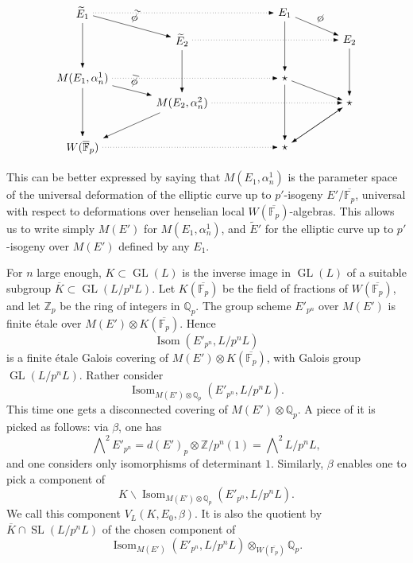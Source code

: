 \documentclass[11pt]{article}
\newcommand{\Z}{\mathbb{Z}}
\newcommand{\Fp}{\mathbb{F}_{p}}
\newcommand{\Qp}{\mathbb{Q}_{p}}
\newcommand{\Zp}{\mathbb{Z}_{p}}
\newcommand{\Isom}{\operatorname{Isom}}
\newcommand{\GL}{\operatorname{GL}}
\newcommand{\SL}{\operatorname{SL}}
\newcommand{\wt}{\widetilde}
\begin{document}
\begin{enumerate}[label=(\alph*)]
\[
\begin{tikzpicture}[x=1.05cm,y=0.78cm,>=Latex,baseline=(current bounding box.center)]
  \node (Et1) at (0,4.2) {$\widetilde E_1$};
  \node (Et2) at (3.0,3.1) {$\widetilde E_2$};
  \node (M1)  at (0,1.55) {$M(E_1,\alpha_n^1)$};
  \node (M2)  at (3.0,0.55) {$M(E_2,\alpha_n^2)$};
  \node (W)   at (0,-1.25) {$W(\overline{\mathbb F}_p)$};
  \node (E1)  at (6.1,4.2) {$E_1$};
  \node (E2)  at (8.05,3.1) {$E_2$};
  \node (s1)  at (6.1,1.55) {$\star$};
  \node (s2)  at (8.05,0.55) {$\star$};
  \node (s3)  at (6.1,-1.25) {$\star$};
  \draw[->] (Et1) -- node[above,sloped] {$\widetilde\phi$} (Et2);
  \draw[->] (M1) -- node[above,sloped] {$\overline\phi$} (M2);
  \draw[->] (E1) -- node[above,sloped] {$\phi$} (E2);
  \draw[->] (Et1) -- (M1);
  \draw[->] (Et2) -- (M2);
  \draw[->] (M1) -- (W);
  \draw[->] (M2) -- (W);
  \draw[->] (E1) -- (s1);
  \draw[->] (E2) -- (s2);
  \draw[->] (s1) -- (s3);
  \draw[->] (s2) -- (s3);
  \draw[->] (s1) -- (s2);
  \draw[->] (s3) -- (s2);
  \draw[dotted,->] (Et1) -- (E1);
  \draw[dotted,->] (Et2) -- (E2);
  \draw[dotted,->] (M1) -- (s1);
  \draw[dotted,->] (M2) -- (s2);
  \draw[dotted,->] (W) -- (s3);
\end{tikzpicture}
\]

\end{enumerate}

This can be better expressed by saying that \(M(E_1,\alpha_n^1)\) is the parameter space of the universal deformation of the elliptic curve up to \(p'\)-isogeny \(E'/\overline{\Fp}\), universal with respect to deformations over henselian local \(W(\overline{\Fp})\)-algebras. This allows us to write simply \(M(E')\) for \(M(E_1,\alpha_n^1)\), and \(\wt E'\) for the elliptic curve up to \(p'\)-isogeny over \(M(E')\) defined by any \(E_1\).

For \(n\) large enough, \(K\subset\GL(L)\) is the inverse image in \(\GL(L)\) of a suitable subgroup \(\overline K\subset\GL(L/p^nL)\). Let \(K(\overline{\Fp})\) be the field of fractions of \(W(\overline{\Fp})\), and let \(\Zp\) be the ring of integers in \(\Qp\). The group scheme \(E'_{p^n}\) over \(M(E')\) is finite étale over \(M(E')\otimes K(\overline{\Fp})\). Hence
\[
\Isom(E'_{p^n},L/p^nL)
\]
is a finite étale Galois covering of \(M(E')\otimes K(\overline{\Fp})\), with Galois group \(\GL(L/p^nL)\). Rather consider
\[
\Isom_{M(E')\otimes\Qp}(E'_{p^n},L/p^nL).
\]
This time one gets a disconnected covering of \(M(E')\otimes\Qp\). A piece of it is picked as follows: via \(\beta\), one has
\[
\bigwedge\nolimits^2E'_{p^n}=d(E')_p\otimes\Z/p^n(1)=\bigwedge\nolimits^2L/p^nL,
\]
and one considers only isomorphisms of determinant \(1\). Similarly, \(\beta\) enables one to pick a component of
\[
K\backslash\Isom_{M(E')\otimes\Qp}(E'_{p^n},L/p^nL).
\]
We call this component \(V_L(K,E_0,\beta)\). It is also the quotient by \(\overline K\cap\SL(L/p^nL)\) of the chosen component of
\[
\Isom_{M(E')}(E'_{p^n},L/p^nL)\otimes_{W(\overline{\Fp})}\Qp .
\]
\end{document}

